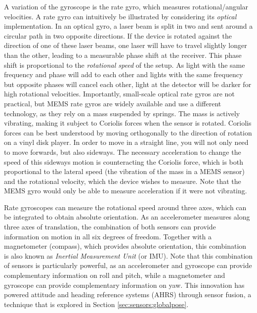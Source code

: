 A variation of the gyroscope is the rate gyro, which measures rotational/angular velocities. A rate gyro  can intuitively be illustrated by considering its \textsl{optical} implementation.
In an optical gyro, a laser beam is split in two and sent around a circular path in two opposite directions. If the device is rotated against the direction of one of these laser beams, one laser will have to travel slightly longer than the other, leading to a measurable phase shift at the receiver.
This phase shift is proportional to the \textsl{rotational speed} of the setup. As light with the same frequency and phase will add to each other and lights with the same frequency but opposite phases will cancel each other, light at the detector will be darker for high rotational velocities.
Importantly, small-scale optical rate gyros are not practical, but MEMS rate gyros are widely available and use a different technology, as they rely on a mass suspended by springs. The mass is actively vibrating, making it subject to Coriolis forces when the sensor is rotated. Coriolis forces can be best understood by moving orthogonally to the direction of rotation on a vinyl disk player. In order to move in a straight line, you will not only need to move forwards, but also sideways. The necessary acceleration to change the speed of this sideways motion is counteracting the Coriolis force, which is both proportional to the lateral speed (the vibration of the mass in a MEMS sensor) and the rotational velocity, which the device wishes to measure. Note that the MEMS gyro would only be able to measure acceleration if it were not vibrating.

Rate gyroscopes can measure the rotational speed around three axes, which can be integrated to obtain absolute orientation. As an accelerometer measures along three axes of translation, the combination of both sensors can provide information on motion in all six degrees of freedom. Together with a magnetometer (compass), which provides absolute orientation, this combination is also known as \textsl{Inertial Measurement Unit} (or IMU). Note that this combination of sensors is particularly powerful, as an accelerometer and gyroscope can provide complementary information on roll and pitch, while a magnetometer and gyroscope can provide complementary information on yaw. This innovation has powered attitude and heading reference systems (AHRS) through sensor fusion, a technique that is explored in Section \cref{sec:sensors:globalpose}.

